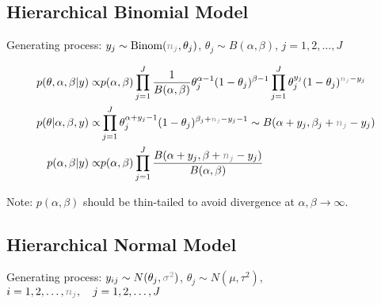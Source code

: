 \subsection{Hierarchical Binomial Model}\label{SubSubSectionBayesianHierarchicalBinom}

Generating process: $ y_j\sim \mathrm{ Binom }(\fixed{n_j},\theta _j)  $, $ \theta _j\sim B(\alpha ,\beta ) $, $ j=1,2,\ldots, J $


\begin{align*}
    p(\theta ,\alpha ,\beta |y)\propto & p(\alpha ,\beta )\prod_{j=1}^J\dfrac{ 1 }{ B(\alpha ,\beta ) }\theta _j^{\alpha -1}(1-\theta _j)^{\beta -1}\prod_{j=1}^J\theta _j^{y_j}(1-\theta _j)^{\fixed{n_j}-y_j}\\
    p(\theta |\alpha ,\beta ,y)\propto & \prod_{j=1}^J\theta_j ^{\alpha +y_j-1}(1-\theta _j)^{\beta _j+\fixed{n_j}-y_j-1}\sim B(\alpha +y_j, \beta _j+\fixed{n_j}-y_j)\\
    p(\alpha ,\beta |y)\propto & p(\alpha ,\beta )\prod_{j=1}^J\dfrac{ B(\alpha +y_j, \beta +\fixed{n_j}-y_j) }{ B(\alpha ,\beta ) }  
\end{align*}

    Note: $ p(\alpha ,\beta ) $ should be thin-tailed to avoid divergence at $ \alpha ,\beta \to\infty $.


    




\subsection{Hierarchical Normal Model}\label{SubSubSectionBayesianHierarchicalNormal}

Generating process: $ y_{ij}\sim N(\theta  _j,\fixed{\sigma ^2})  $, $ \theta _j\sim N(\mu ,\tau^2 ) $, $ i=1,2,\ldots,\fixed{n_j},\quad j=1,2,\ldots, J $


